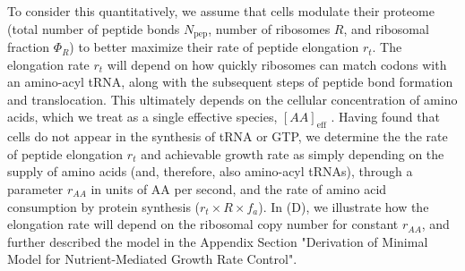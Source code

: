 


To consider this quantitatively, we assume that cells modulate their proteome
(total number of peptide bonds $N_\text{pep}$, number of ribosomes $R$, and
ribosomal fraction $\Phi_R$) to better maximize their rate of peptide elongation
$r_t$. The elongation rate $r_t$ will depend on how quickly ribosomes can match
codons with an amino-acyl tRNA, along with the subsequent steps of peptide bond
formation and translocation. This ultimately depends on the cellular
concentration of amino acids, which we treat as a single effective species,
$[AA]_\text{eff}$ \citep{bosdriesz2015}. Having found that cells do not appear
in the synthesis of tRNA or GTP, we determine the the rate of peptide elongation
$r_t$ and achievable growth rate as simply depending on the supply of amino
acids (and, therefore, also amino-acyl tRNAs), through a parameter $r_{AA}$ in
units of AA per second, and the rate of amino acid consumption by protein
synthesis ($r_t \times R \times f_a$). In (D), we
illustrate how the elongation rate will depend on the ribosomal copy number for
constant $r_{AA}$, and further described the  model in the Appendix Section
"Derivation of Minimal Model for Nutrient-Mediated Growth Rate Control".

